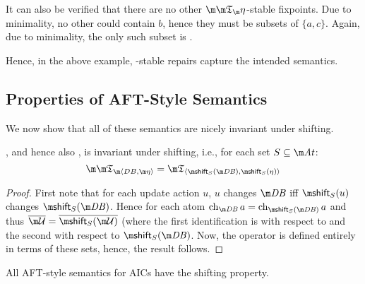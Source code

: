 \begin{example}
It can also be verified that there are no other $\Ap$-stable fixpoints. Due to minimality, no other could contain $b$, hence they must be subsets of $\{a,c\}$. Again, due to minimality, the only such subset is \UU. 
\end{example}

Hence, in the above example, \Ap-stable repairs capture the intended semantics. 

\subsection{Properties of AFT-Style Semantics}

We now show that all of these semantics are nicely invariant under shifting. 
\begin{proposition}
 \Ap, and hence also \Op, is invariant under shifting, i.e., for each set $S\subseteq \atoms$:
 \[\Apfull = \threeap_{\langle\shift_S(\db),\shift_S(\eta)\rangle}\]
\end{proposition}
\begin{proof}
First note that for each update action $u$, $u$ changes $\db$ iff $\shift_S(u)$ changes $\shift_S(\db)$. Hence for each atom $\change_{\db} a = \change_{\shift_S(\db)} a$ and thus
$\overline{\UU}=\overline{\shift_S(\UU)}$ 
(where the first identification is with respect to \db and the second with respect to $\shift_S(\db)$. 
Now, the operator \Ap is defined entirely in terms of these sets, hence, the result follows. 
\end{proof}
\begin{corollary}
 All AFT-style semantics for AICs have the shifting property. 
\end{corollary}


